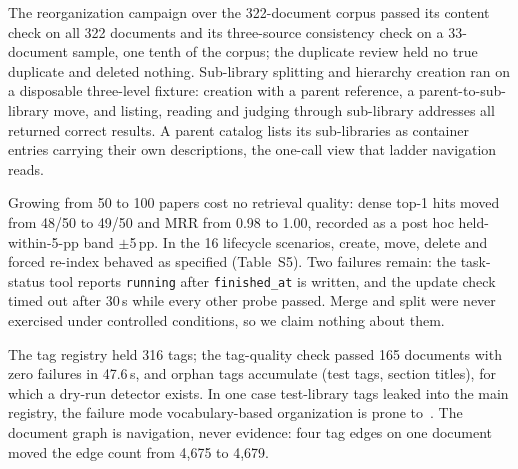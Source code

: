The reorganization campaign over the 322-document corpus passed its content
check on all 322 documents and its three-source consistency check on a
33-document sample, one tenth of the corpus; the duplicate review held no true
duplicate and deleted nothing. Sub-library splitting and hierarchy
creation ran on a disposable three-level fixture: creation with a parent
reference, a parent-to-sub-library move, and listing, reading and judging
through sub-library addresses all returned correct results. A parent catalog
lists its sub-libraries as container entries carrying their own descriptions,
the one-call view that ladder navigation reads.

Growing from 50 to 100 papers cost no retrieval quality: dense top-1 hits moved
from 48/50 to 49/50 and MRR from 0.98 to 1.00, recorded as a post hoc
held-within-5-pp band
$\pm$5\,pp. In the 16 lifecycle scenarios, create, move, delete and forced
re-index behaved as specified (Table~S5). Two failures remain: the task-status
tool reports \texttt{running} after \texttt{finished\_at} is written, and the
update check timed out after 30\,s while every other probe passed. Merge and
split were never exercised under controlled conditions, so we claim nothing
about them.

The tag registry held 316 tags; the tag-quality check passed 165
documents with zero failures in 47.6\,s, and orphan tags accumulate (test tags,
section titles), for which a dry-run detector exists. In one case test-library
tags leaked into the main registry, the failure mode vocabulary-based
organization is prone to~\cite{golder-tagging-2006}. The document graph is
navigation, never evidence: four tag edges on one document moved the edge count
from 4{,}675 to 4{,}679.
